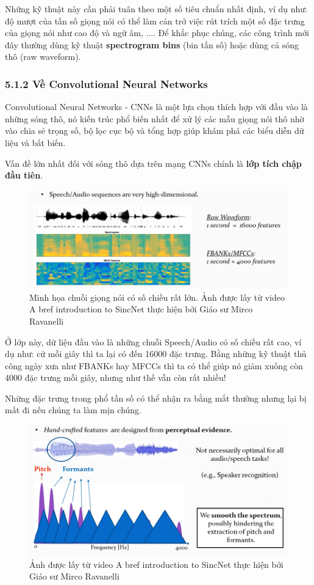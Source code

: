 \documentclass{article}
\begin{document}
	Những kỹ thuật này cần phải tuân theo một số tiêu chuẩn nhất định, ví dụ như: độ mượt của tần số giọng nói có thể làm cản trở việc rút trích một số đặc trưng của giọng nói như cao độ và ngữ âm, .... Để khắc phục chúng, các công trình mới đây thường dùng kỹ thuật \textbf{spectrogram bins} (bin tần số) hoặc dùng cả sóng thô (raw waveform).
	
	\subsubsection{5.1.2 Về Convolutional Neural Networks}
	\qquad Convolutional Neural Networks - CNNs là một lựa chọn thích hợp với đầu vào là những sóng thô, nó kiến trúc phổ biến nhất để xử lý các mẫu giọng nói thô nhờ vào chia sẻ trọng số, bộ lọc cục bộ và tổng hợp giúp khám phá các biểu diễn dữ liệu và bất biến.
	
	Vấn đề lớn nhất đối với sóng thô dựa trên mạng CNNs chính là \textbf{lớp tích chập đầu tiên}.
	\begin{figure}[H]
		\centering
		\includegraphics[width=1\textwidth]{images/capture_01.png}
		\caption{Minh họa chuỗi giọng nói có số chiều rất lớn. Ảnh được lấy từ video A bref introduction to SincNet thực hiện bởi Giáo sư Mirco Ravanelli}
		\label{fig:writing-thesis}
	\end{figure}
	Ở lớp này, dữ liệu đầu vào là những chuỗi Speech/Audio có số chiều rất cao, ví dụ như: cứ mỗi giây thì ta lại có đến 16000 đặc trưng. Bằng những kỹ thuật thủ công ngày xưa như FBANKs hay MFCCs thì ta có thể giúp nó giảm xuống còn 4000 đặc trưng mỗi giây, nhưng như thế vẫn còn rất nhiều!
	
	Những đặc trưng trong phổ tần số có thể nhận ra bằng mắt thường nhưng lại bị mất đi nếu chúng ta làm mịn chúng.
	\begin{figure}[H]
		\centering
		\includegraphics[width=1\textwidth]{images/perceptual_evidence.png}
		\caption{Ảnh được lấy từ video A bref introduction to SincNet thực hiện bởi Giáo sư Mirco Ravanelli}
		\label{fig:writing-thesis}
	\end{figure}
	
\end{document}
